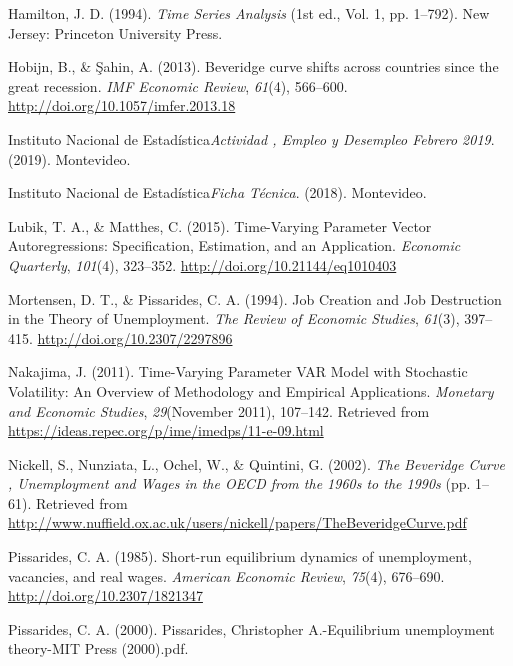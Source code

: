 \documentclass[12pt,twoside]{reedthesis}
\begin{document}
\leavevmode\hypertarget{ref-Hamilton1994}{}%
Hamilton, J. D. (1994). \emph{Time Series Analysis} (1st ed., Vol. 1, pp. 1--792). New Jersey: Princeton University Press.

\leavevmode\hypertarget{ref-Hobijn2013}{}%
Hobijn, B., \& Şahin, A. (2013). Beveridge curve shifts across countries since the great recession. \emph{IMF Economic Review}, \emph{61}(4), 566--600. \url{http://doi.org/10.1057/imfer.2013.18}

\leavevmode\hypertarget{ref-INE2019}{}%
Instituto Nacional de Estadística\emph{Actividad , Empleo y Desempleo Febrero 2019}. (2019). Montevideo.

\leavevmode\hypertarget{ref-INE2018}{}%
Instituto Nacional de Estadística\emph{Ficha Técnica}. (2018). Montevideo.

\leavevmode\hypertarget{ref-Lubik2016b}{}%
Lubik, T. A., \& Matthes, C. (2015). Time-Varying Parameter Vector Autoregressions: Specification, Estimation, and an Application. \emph{Economic Quarterly}, \emph{101}(4), 323--352. \url{http://doi.org/10.21144/eq1010403}

\leavevmode\hypertarget{ref-Mortensen1994}{}%
Mortensen, D. T., \& Pissarides, C. A. (1994). Job Creation and Job Destruction in the Theory of Unemployment. \emph{The Review of Economic Studies}, \emph{61}(3), 397--415. \url{http://doi.org/10.2307/2297896}

\leavevmode\hypertarget{ref-Nakajima2011}{}%
Nakajima, J. (2011). Time-Varying Parameter VAR Model with Stochastic Volatility: An Overview of Methodology and Empirical Applications. \emph{Monetary and Economic Studies}, \emph{29}(November 2011), 107--142. Retrieved from \url{https://ideas.repec.org/p/ime/imedps/11-e-09.html}

\leavevmode\hypertarget{ref-Nickell2002}{}%
Nickell, S., Nunziata, L., Ochel, W., \& Quintini, G. (2002). \emph{The Beveridge Curve , Unemployment and Wages in the OECD from the 1960s to the 1990s} (pp. 1--61). Retrieved from \url{http://www.nuffield.ox.ac.uk/users/nickell/papers/TheBeveridgeCurve.pdf}

\leavevmode\hypertarget{ref-Pissarides1985}{}%
Pissarides, C. A. (1985). Short-run equilibrium dynamics of unemployment, vacancies, and real wages. \emph{American Economic Review}, \emph{75}(4), 676--690. \url{http://doi.org/10.2307/1821347}

\leavevmode\hypertarget{ref-Pissarides2000}{}%
Pissarides, C. A. (2000). Pissarides, Christopher A.-Equilibrium unemployment theory-MIT Press (2000).pdf.
\end{document}
